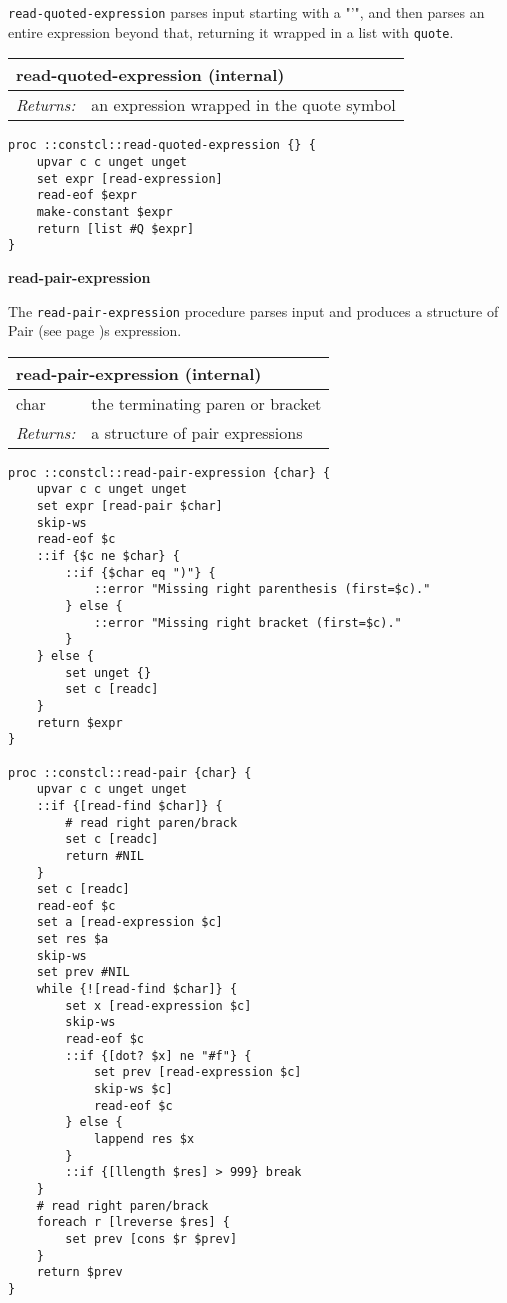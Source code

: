 \documentclass{report}
\begin{document}
\texttt{read-quoted-expression} parses input starting with a "'", and then parses an entire expression beyond that, returning it wrapped in a list with \texttt{quote}.

\begin{tabular}{ |l l| }
\hline
\multicolumn{2}{|l|}{read-quoted-expression (internal)} \\
\hline
\textit{Returns:} & an expression wrapped in the quote symbol \\
\hline
\end{tabular}

\noindent\makebox[\linewidth]{\rule{\linewidth}{0.4pt}}
\begin{lstlisting}
proc ::constcl::read-quoted-expression {} {
    upvar c c unget unget
    set expr [read-expression]
    read-eof $expr
    make-constant $expr
    return [list #Q $expr]
}
\end{lstlisting}
\noindent\makebox[\linewidth]{\rule{\linewidth}{0.4pt}}

\textbf{read-pair-expression}


The \texttt{read-pair-expression} procedure parses input and produces a structure of Pair (see page \pageref{pairs-and-lists})s expression.

\begin{tabular}{ |l l| }
\hline
\multicolumn{2}{|l|}{read-pair-expression (internal)} \\
\hline
char & the terminating paren or bracket \\
\textit{Returns:} & a structure of pair expressions \\
\hline
\end{tabular}

\noindent\makebox[\linewidth]{\rule{\linewidth}{0.4pt}}
\begin{lstlisting}
proc ::constcl::read-pair-expression {char} {
    upvar c c unget unget
    set expr [read-pair $char]
    skip-ws
    read-eof $c
    ::if {$c ne $char} {
        ::if {$char eq ")"} {
            ::error "Missing right parenthesis (first=$c)."
        } else {
            ::error "Missing right bracket (first=$c)."
        }
    } else {
        set unget {}
        set c [readc]
    }
    return $expr
}
 
proc ::constcl::read-pair {char} {
    upvar c c unget unget
    ::if {[read-find $char]} {
        # read right paren/brack
        set c [readc]
        return #NIL
    }
    set c [readc]
    read-eof $c
    set a [read-expression $c]
    set res $a
    skip-ws
    set prev #NIL
    while {![read-find $char]} {
        set x [read-expression $c]
        skip-ws
        read-eof $c
        ::if {[dot? $x] ne "#f"} {
            set prev [read-expression $c]
            skip-ws $c]
            read-eof $c
        } else {
            lappend res $x
        }
        ::if {[llength $res] > 999} break
    }
    # read right paren/brack
    foreach r [lreverse $res] {
        set prev [cons $r $prev]
    }
    return $prev
}
\end{lstlisting}
\noindent\makebox[\linewidth]{\rule{\linewidth}{0.4pt}}
\end{document}
